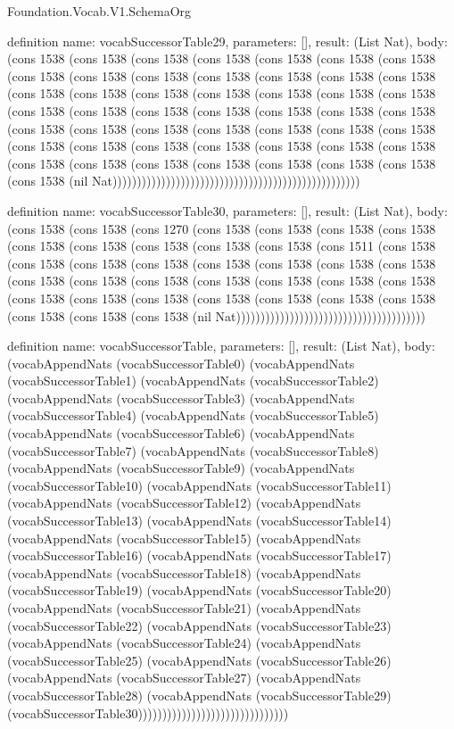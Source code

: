 \begin{lexlean}{Foundation.Vocab.V1.SchemaOrg}
\begin{semanticmodule}
definition{
  name: vocabSuccessorTable29,
  parameters: [],
  result: (List Nat),
  body: (cons 1538 (cons 1538 (cons 1538 (cons 1538 (cons 1538 (cons 1538 (cons 1538 (cons 1538 (cons 1538 (cons 1538 (cons 1538 (cons 1538 (cons 1538 (cons 1538 (cons 1538 (cons 1538 (cons 1538 (cons 1538 (cons 1538 (cons 1538 (cons 1538 (cons 1538 (cons 1538 (cons 1538 (cons 1538 (cons 1538 (cons 1538 (cons 1538 (cons 1538 (cons 1538 (cons 1538 (cons 1538 (cons 1538 (cons 1538 (cons 1538 (cons 1538 (cons 1538 (cons 1538 (cons 1538 (cons 1538 (cons 1538 (cons 1538 (cons 1538 (cons 1538 (cons 1538 (cons 1538 (cons 1538 (cons 1538 (cons 1538 (cons 1538 (nil Nat)))))))))))))))))))))))))))))))))))))))))))))))))))
}

definition{
  name: vocabSuccessorTable30,
  parameters: [],
  result: (List Nat),
  body: (cons 1538 (cons 1538 (cons 1270 (cons 1538 (cons 1538 (cons 1538 (cons 1538 (cons 1538 (cons 1538 (cons 1538 (cons 1538 (cons 1538 (cons 1511 (cons 1538 (cons 1538 (cons 1538 (cons 1538 (cons 1538 (cons 1538 (cons 1538 (cons 1538 (cons 1538 (cons 1538 (cons 1538 (cons 1538 (cons 1538 (cons 1538 (cons 1538 (cons 1538 (cons 1538 (cons 1538 (cons 1538 (cons 1538 (cons 1538 (cons 1538 (cons 1538 (cons 1538 (cons 1538 (nil Nat)))))))))))))))))))))))))))))))))))))))
}

definition{
  name: vocabSuccessorTable,
  parameters: [],
  result: (List Nat),
  body: (vocabAppendNats (vocabSuccessorTable0) (vocabAppendNats (vocabSuccessorTable1) (vocabAppendNats (vocabSuccessorTable2) (vocabAppendNats (vocabSuccessorTable3) (vocabAppendNats (vocabSuccessorTable4) (vocabAppendNats (vocabSuccessorTable5) (vocabAppendNats (vocabSuccessorTable6) (vocabAppendNats (vocabSuccessorTable7) (vocabAppendNats (vocabSuccessorTable8) (vocabAppendNats (vocabSuccessorTable9) (vocabAppendNats (vocabSuccessorTable10) (vocabAppendNats (vocabSuccessorTable11) (vocabAppendNats (vocabSuccessorTable12) (vocabAppendNats (vocabSuccessorTable13) (vocabAppendNats (vocabSuccessorTable14) (vocabAppendNats (vocabSuccessorTable15) (vocabAppendNats (vocabSuccessorTable16) (vocabAppendNats (vocabSuccessorTable17) (vocabAppendNats (vocabSuccessorTable18) (vocabAppendNats (vocabSuccessorTable19) (vocabAppendNats (vocabSuccessorTable20) (vocabAppendNats (vocabSuccessorTable21) (vocabAppendNats (vocabSuccessorTable22) (vocabAppendNats (vocabSuccessorTable23) (vocabAppendNats (vocabSuccessorTable24) (vocabAppendNats (vocabSuccessorTable25) (vocabAppendNats (vocabSuccessorTable26) (vocabAppendNats (vocabSuccessorTable27) (vocabAppendNats (vocabSuccessorTable28) (vocabAppendNats (vocabSuccessorTable29) (vocabSuccessorTable30)))))))))))))))))))))))))))))))
}
\end{semanticmodule}
\end{lexlean}
